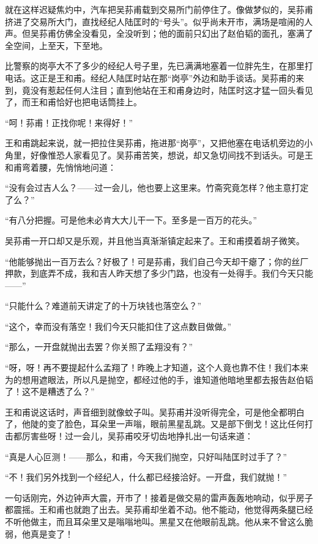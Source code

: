 \par 就在这样迟疑焦灼中，汽车把吴荪甫载到交易所门前停住了。像做梦似的，吴荪甫挤进了交易所大门，直找经纪人陆匡时的“号头”。似乎尚未开市，满场是喧闹的人声。但吴荪甫仿佛全没看见，全没听到；他的面前只幻出了赵伯韬的面孔，塞满了全空间，上至天，下至地。
\par 比警察的岗亭大不了多少的经纪人号子里，先已满满地塞着一位胖先生，在那里打电话。这正是王和甫。经纪人陆匡时站在那“岗亭”外边和助手谈话。吴荪甫的来到，竟没有惹起任何人注目；直到他站在王和甫身边时，陆匡时这才猛一回头看见了，而王和甫恰好也把电话筒挂上。
\par “呵！荪甫！正找你呢！来得好！”
\par 王和甫跳起来说，就一把拉住吴荪甫，拖进那“岗亭”，又把他塞在电话机旁边的小角里，好像惟恐人家看见了。吴荪甫苦笑，想说，却又急切间找不到话头。可是王和甫弯着腰，先悄悄地问道：
\par “没有会过吉人么？——过一会儿，他也要上这里来。竹斋究竟怎样？他主意打定了么？”
\par “有八分把握。可是他未必肯大大儿干一下。至多是一百万的花头。”
\par 吴荪甫一开口却又是乐观，并且他当真渐渐镇定起来了。王和甫摸着胡子微笑。
\par “他能够抛出一百万去么？好极了！可是荪甫，我们自己今天却干瘪了；你的丝厂押款，到底弄不成，我和吉人昨天想了多少门路，也没有一处得手。我们今天只能——”
\par “只能什么？难道前天讲定了的十万块钱也落空么？”
\par “这个，幸而没有落空！我们今天只能扣住了这点数目做做。”
\par “那么，一开盘就抛出去罢？你关照了孟翔没有？”
\par “呀，呀！再不要提起什么孟翔了！昨晚上才知道，这个人竟也靠不住！我们本来为的想用遮眼法，所以凡是抛空，都经过他的手，谁知道他暗地里都去报告赵伯韬了！这不是糟透了么？”
\par 王和甫说这话时，声音细到就像蚊子叫。吴荪甫并没听得完全，可是他全都明白了，他陡的变了脸色，耳朵里一声嗡，眼前黑星乱跳。又是部下倒戈！这比任何打击都厉害些呀！过一会儿，吴荪甫咬牙切齿地挣扎出一句话来道：
\par “真是人心叵测！——那么，和甫，今天我们抛空，只好叫陆匡时过手了？”
\par “不！我们另外找到一个经纪人，什么都已经接洽好。一开盘，我们就抛！”
\par 一句话刚完，外边钟声大震，开市了！接着是做交易的雷声轰轰地响动，似乎房子都震摇。王和甫也就跑了出去。吴荪甫却坐着不动。他不能动，他觉得两条腿已经不听他做主，而且耳朵里又是嗡嗡地叫。黑星又在他眼前乱跳。他从来不曾这么脆弱，他真是变了！
